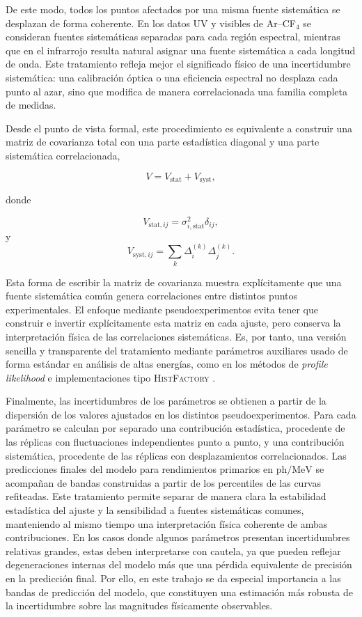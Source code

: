\documentclass[12pt,a4paper]{article}
\begin{document}
De este modo, todos los puntos afectados por una misma fuente sistemática se desplazan de forma coherente. En los datos UV y visibles de Ar--CF$_4$ se consideran fuentes sistemáticas separadas para cada región espectral, mientras que en el infrarrojo resulta natural asignar una fuente sistemática a cada longitud de onda. Este tratamiento refleja mejor el significado físico de una incertidumbre sistemática: una calibración óptica o una eficiencia espectral no desplaza cada punto al azar, sino que modifica de manera correlacionada una familia completa de medidas.

Desde el punto de vista formal, este procedimiento es equivalente a construir una matriz de covarianza total con una parte estadística diagonal y una parte sistemática correlacionada,

\[
V
=
V_{\mathrm{stat}}
+
V_{\mathrm{syst}},
\]

donde

\[
V_{\mathrm{stat},ij}
=
\sigma_{i,\mathrm{stat}}^2\delta_{ij},
\]
y
\[
V_{\mathrm{syst},ij}
=\sum_k
\Delta_i^{(k)}\Delta_j^{(k)}.
\]

Esta forma de escribir la matriz de covarianza muestra explícitamente que una fuente sistemática común genera correlaciones entre distintos puntos experimentales. El enfoque mediante pseudoexperimentos evita tener que construir e invertir explícitamente esta matriz en cada ajuste, pero conserva la interpretación física de las correlaciones sistemáticas. Es, por tanto, una versión sencilla y transparente del tratamiento mediante parámetros auxiliares usado de forma estándar en análisis de altas energías, como en los métodos de \textit{profile likelihood} e implementaciones tipo \textsc{HistFactory} \cite{Cowan2011,Cranmer2012HistFactory}.

Finalmente, las incertidumbres de los parámetros se obtienen a partir de la dispersión de los valores ajustados en los distintos pseudoexperimentos. Para cada parámetro se calculan por separado una contribución estadística, procedente de las réplicas con fluctuaciones independientes punto a punto, y una contribución sistemática, procedente de las réplicas con desplazamientos correlacionados. Las predicciones finales del modelo para rendimientos primarios en $\mathrm{ph/MeV}$ se acompañan de bandas construidas a partir de los percentiles de las curvas refiteadas. Este tratamiento permite separar de manera clara la estabilidad estadística del ajuste y la sensibilidad a fuentes sistemáticas comunes, manteniendo al mismo tiempo una interpretación física coherente de ambas contribuciones. En los casos donde algunos parámetros presentan incertidumbres relativas grandes, estas deben interpretarse con cautela, ya que pueden reflejar degeneraciones internas del modelo más que una pérdida equivalente de precisión en la predicción final. Por ello, en este trabajo se da especial importancia a las bandas de predicción del modelo, que constituyen una estimación más robusta de la incertidumbre sobre las magnitudes físicamente observables.
\end{document}
